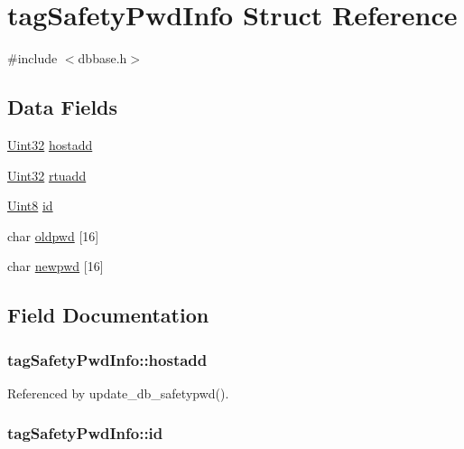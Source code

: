 \hypertarget{structtagSafetyPwdInfo}{\section{tag\-Safety\-Pwd\-Info Struct Reference}
\label{structtagSafetyPwdInfo}
}


{\ttfamily \#include $<$dbbase.\-h$>$}

\subsection*{Data Fields}
\begin{DoxyCompactItemize}
\item 
\hyperlink{base_8h_a60cf7b3c038ce37a50796e8eaddf0b5f}{Uint32} \hyperlink{structtagSafetyPwdInfo_aec405d805fecfb4afdf892fbc3fa9ebc}{hostadd}
\item 
\hyperlink{base_8h_a60cf7b3c038ce37a50796e8eaddf0b5f}{Uint32} \hyperlink{structtagSafetyPwdInfo_a66f0ab9e1b85179ba191e8e4e9dd7995}{rtuadd}
\item 
\hyperlink{base_8h_af84840501dec18061d18a68c162a8fa2}{Uint8} \hyperlink{structtagSafetyPwdInfo_a78ca58262a283c3ca61d5527e803545d}{id}
\item 
char \hyperlink{structtagSafetyPwdInfo_aac781c8cd1814eb92a0403b0308db79c}{oldpwd} \mbox{[}16\mbox{]}
\item 
char \hyperlink{structtagSafetyPwdInfo_a0867e7e3865114da0143f853444255e9}{newpwd} \mbox{[}16\mbox{]}
\end{DoxyCompactItemize}


\subsection{Field Documentation}
\hypertarget{structtagSafetyPwdInfo_aec405d805fecfb4afdf892fbc3fa9ebc}{
\subsubsection[{hostadd}]{ tag\-Safety\-Pwd\-Info\-::hostadd}}\label{structtagSafetyPwdInfo_aec405d805fecfb4afdf892fbc3fa9ebc}


Referenced by update\-\_\-db\-\_\-safetypwd().

\hypertarget{structtagSafetyPwdInfo_a78ca58262a283c3ca61d5527e803545d}{
\subsubsection[{id}]{ tag\-Safety\-Pwd\-Info\-::id}}\label{structtagSafetyPwdInfo_a78ca58262a283c3ca61d5527e803545d}


